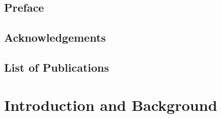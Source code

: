 \documentclass[
	fontsize=10pt, %
	twoside=true, %
	secnumdepth=3, %
	numbers=noenddot, %
]{kaobook}
\begin{document}
\chapter*{Preface}




\chapter*{Acknowledgements}


\chapter*{List of Publications}



\thesisfrontlists


\mainmatter %




\part{Introduction and Background}\label{part:background}
\end{document}

